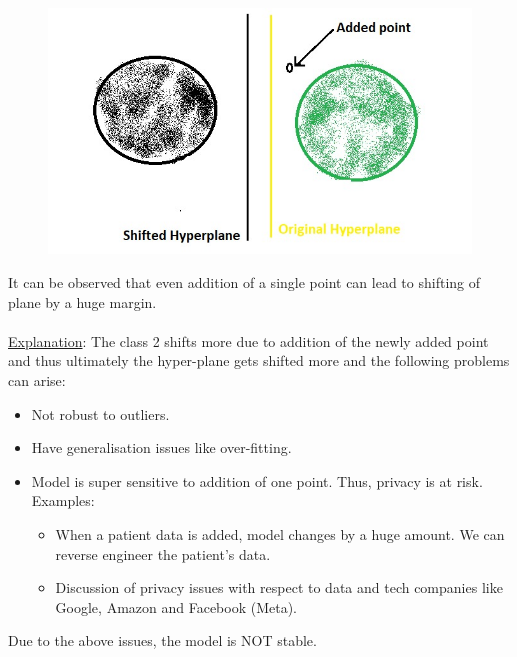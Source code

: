 \documentclass[11pt, twosides]{article}
\begin{document}
\begin{figure}[htbp]
\begin{center}
\includegraphics[scale=0.43]{419_3.jpeg}
\caption{}
\end{center}
\end{figure} 
It can be observed that even addition of a single point can lead to shifting of plane by a huge margin.\\ \\
\underline{Explanation}: The class 2 shifts more due to addition of the newly added point and thus ultimately the hyper-plane gets shifted more and the following problems can arise:
\begin{itemize}
    \item Not robust to outliers.
    \item Have generalisation issues like over-fitting.
    \item Model is super sensitive to addition of one point. Thus, privacy is at risk.
    Examples:
    \begin{itemize}
        \item When a patient data is added, model changes by a huge amount. We can reverse engineer the patient's data.
        \item Discussion of privacy issues with respect to data and tech companies like Google, Amazon and Facebook (Meta).
    \end{itemize}

\end{itemize}
Due to the above issues, the model is NOT stable.
\end{document}
